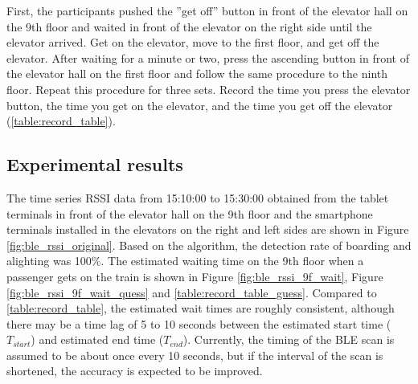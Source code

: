 First, the participants pushed the ''get off'' button in front of the elevator hall on the 9th floor and waited in front of the elevator on the right side until the elevator arrived. Get on the elevator, move to the first floor, and get off the elevator. After waiting for a minute or two, press the ascending button in front of the elevator hall on the first floor and follow the same procedure to the ninth floor. Repeat this procedure for three sets. Record the time you press the elevator button, the time you get on the elevator, and the time you get off the elevator (\tablename\ref{table:record_table}).


\subsection{Experimental results}

The time series RSSI data from 15:10:00 to 15:30:00 obtained from the tablet terminals in front of the elevator hall on the 9th floor and the smartphone terminals installed in the elevators on the right and left sides are shown in Figure \ref{fig:ble_rssi_original}.
Based on the algorithm, the detection rate of boarding and alighting was 100\%. The estimated waiting time on the 9th floor when a passenger gets on the train is shown in Figure \ref{fig:ble_rssi_9f_wait}, Figure \ref{fig:ble_rssi_9f_wait_quess} and \tablename\ref{table:record_table_guess}. Compared to \tablename\ref{table:record_table}, the estimated wait times are roughly consistent, although there may be a time lag of 5 to 10 seconds between the estimated start time ($T_{start}$) and estimated end time ($T_{end}$). Currently, the timing of the BLE scan is assumed to be about once every 10 seconds, but if the interval of the scan is shortened, the accuracy is expected to be improved.

